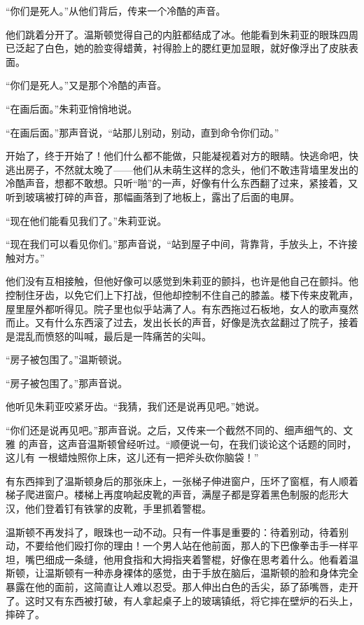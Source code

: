 ``你们是死人。''从他们背后，传来一个冷酷的声音。

他们跳着分开了。温斯顿觉得自己的内脏都结成了冰。他能看到朱莉亚的眼珠四周已泛起了白色，她的脸变得蜡黄，衬得脸上的腮红更加显眼，就好像浮出了皮肤表面。

``你们是死人。''又是那个冷酷的声音。

``在画后面。''朱莉亚悄悄地说。

``在画后面。''那声音说，``站那儿别动，别动，直到命令你们动。''

开始了，终于开始了！他们什么都不能做，只能凝视着对方的眼睛。快逃命吧，快逃出房子，不然就太晚了——他们从未萌生这样的念头，他们不敢违背墙里发出的冷酷声音，想都不敢想。只听``啪''的一声，好像有什么东西翻了过来，紧接着，又听到玻璃被打碎的声音，那幅画落到了地板上，露出了后面的电屏。

``现在他们能看见我们了。''朱莉亚说。

``现在我们可以看见你们。''那声音说，``站到屋子中间，背靠背，手放头上，不许接触对方。''

他们没有互相接触，但他好像可以感觉到朱莉亚的颤抖，也许是他自己在颤抖。他控制住牙齿，以免它们上下打战，但他却控制不住自己的膝盖。楼下传来皮靴声，屋里屋外都听得见。院子里也似乎站满了人。有东西拖过石板地，女人的歌声戛然而止。又有什么东西滚了过去，发出长长的声音，好像是洗衣盆翻过了院子，接着是混乱而愤怒的叫喊，最后是一阵痛苦的尖叫。

``房子被包围了。''温斯顿说。

``房子被包围了。''那声音说。

他听见朱莉亚咬紧牙齿。``我猜，我们还是说再见吧。''她说。

``你们还是说再见吧。''那声音说。之后，又传来一个截然不同的、细声细气的、文雅
的声音，这声音温斯顿曾经听过。``顺便说一句，在我们谈论这个话题的同时，这儿有
一根蜡烛照你上床，这儿还有一把斧头砍你脑袋！''

有东西摔到了温斯顿身后的那张床上，一张梯子伸进窗户，压坏了窗框，有人顺着梯子爬进窗户。楼梯上再度响起皮靴的声音，满屋子都是穿着黑色制服的彪形大汉，他们登着钉有铁掌的皮靴，手里抓着警棍。

温斯顿不再发抖了，眼珠也一动不动。只有一件事是重要的：待着别动，待着别动，不要给他们殴打你的理由！一个男人站在他前面，那人的下巴像拳击手一样平坦，嘴巴细成一条缝，他用食指和大拇指夹着警棍，好像在思考着什么。他看着温斯顿，让温斯顿有一种赤身裸体的感觉，由于手放在脑后，温斯顿的脸和身体完全暴露在他的面前，这简直让人难以忍受。那人伸出白色的舌尖，舔了舔嘴唇，走开了。这时又有东西被打破，有人拿起桌子上的玻璃镇纸，将它摔在壁炉的石头上，摔碎了。

